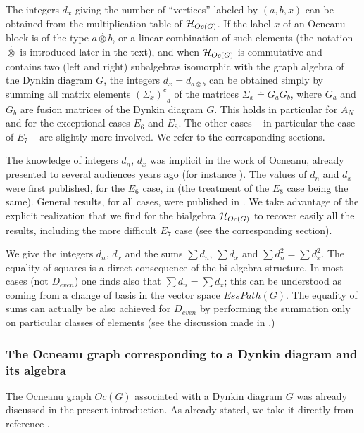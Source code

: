 \documentclass[a4paper,11pt]{article}
\def \otimesdot {\stackrel{\cdot}{\otimes}}
\begin{document}
The integers $d_{x}$ giving the number of ``vertices'' labeled by
$(a,b,x)$ can be obtained from the multiplication table of ${\cal H}_{Oc(G)}$.
If the label $x$ of an Ocneanu block
is of the type $a \otimesdot b$, or a linear combination of such elements
(the notation $\otimesdot$ is
introduced later in the text), and
when ${\cal H}_{Oc(G)}$ is commutative and contains two (left and right)
subalgebras  isomorphic with the graph algebra of the Dynkin diagram $G$,
the integers $d_{x} = d_{a \otimesdot b}$ can be obtained simply by
summing all matrix elements ${(\Sigma_{x})^{c}}_{d}$ of the matrices
$\Sigma_{x} \doteq G_{a}G_{b}$, where $G_{a}$ and $G_{b}$ are fusion matrices
of the Dynkin diagram $G$. This holds in particular for $A_{N}$ and
for the exceptional cases $E_{6}$ and $E_{8}$.
The other cases -- in particular the case of $E_{7}$ -- are slightly more
involved. We refer to the corresponding sections.

The knowledge of integers $d_{n}$, $d_{x}$ was implicit in the work
of Ocneanu, already presented to several audiences years ago (for
instance \cite{Ocneanu:Marseille}). The values of $d_{n}$ and $d_{x}$
were first published, for the $E_{6}$ case, in \cite{Coque:qtetra} (the
treatment  of the $E_{8}$ case being the same). General results, for all
cases, were published in \cite{PetZub:Oc}.
We take advantage of the explicit realization that we
find for the bialgebra ${\cal H}_{Oc(G)}$ to recover easily all the
results, including the more difficult $E_{7}$ case (see the
corresponding section).

We give the integers $d_{n}$, $d_{x}$ and the sums
$\sum d_n$, $\sum d_x$ and $\sum d_n^2 = \sum d_x^2$.
The equality of squares is a direct consequence of the bi-algebra
structure. In most cases (not $D_{even}$) one finds also that $\sum d_n =
\sum d_x$; this can be understood as coming from a change of basis in
the vector
space $EssPath(G)$. The equality of sums can actually be also
achieved for $D_{even}$ by performing the summation only on particular
classes of elements (see the discussion made in \cite{PetZub:Oc}.)


\subsubsection{The Ocneanu graph corresponding to a Dynkin diagram and
its algebra}

The Ocneanu graph $Oc(G)$ associated with a Dynkin diagram $G$ was already
discussed in the present introduction.
As already stated, we take it directly from reference \cite{Ocneanu:paths}.
\end{document}
